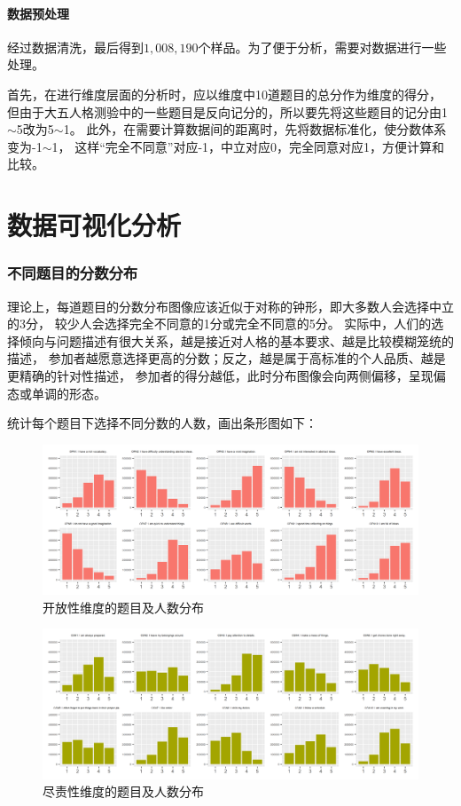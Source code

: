\documentclass[UTF8]{ctexart}
\begin{document}
\subsection*{数据预处理}
经过数据清洗，最后得到$1,008,190$个样品。为了便于分析，需要对数据进行一些处理。\par
首先，在进行维度层面的分析时，应以维度中10道题目的总分作为维度的得分，
但由于大五人格测验中的一些题目是反向记分的，所以要先将这些题目的记分由1$\sim$5改为5$\sim$1。
此外，在需要计算数据间的距离时，先将数据标准化，使分数体系变为-1$\sim$1，
这样“完全不同意”对应-1，中立对应0，完全同意对应1，方便计算和比较。
\part{数据可视化分析}
\setcounter{section}{0}
\section{不同题目的分数分布}
理论上，每道题目的分数分布图像应该近似于对称的钟形，即大多数人会选择中立的3分，
较少人会选择完全不同意的1分或完全不同意的5分。
实际中，人们的选择倾向与问题描述有很大关系，越是接近对人格的基本要求、越是比较模糊笼统的描述，
参加者越愿意选择更高的分数；反之，越是属于高标准的个人品质、越是更精确的针对性描述，
参加者的得分越低，此时分布图像会向两侧偏移，呈现偏态或单调的形态。\par
统计每个题目下选择不同分数的人数，画出条形图如下：
\begin{figure}[H]
  \centering
  \includegraphics[scale=0.478]{OPN.png}
  \caption{开放性维度的题目及人数分布}
\end{figure}
\begin{figure}[H]
  \centering
  \includegraphics[scale=0.478]{CSN.png}
  \caption{尽责性维度的题目及人数分布}
\end{figure}
\end{document}
